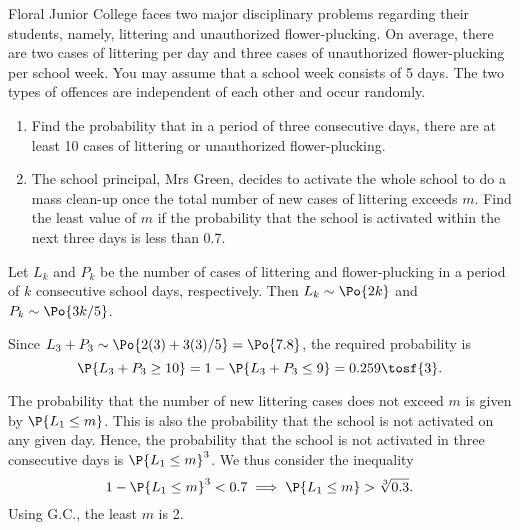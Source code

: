 \begin{problem}
    Floral Junior College faces two major disciplinary problems regarding their students, namely, littering and unauthorized flower-plucking. On average, there are two cases of littering per day and three cases of unauthorized flower-plucking per school week. You may assume that a school week consists of 5 days. The two types of offences are independent of each other and occur randomly.

    \begin{enumerate}
        \item Find the probability that in a period of three consecutive days, there are at least 10 cases of littering or unauthorized flower-plucking.
        \item The school principal, Mrs Green, decides to activate the whole school to do a mass clean-up once the total number of new cases of littering exceeds $m$. Find the least value of $m$ if the probability that the school is activated within the next three days is less than 0.7.
    \end{enumerate}
\end{problem}
\begin{solution}
    Let $L_k$ and $P_k$ be the number of cases of littering and flower-plucking in a period of $k$ consecutive school days, respectively. Then $L_k \sim \Po{2k}$ and $P_k \sim \Po{3k/5}$.

    \begin{ppart}
        Since $L_3 + P_3 \sim \Po{2(3) + 3(3)/5} = \Po{7.8}$, the required probability is \[\P{L_3 + P_3 \geq 10} = 1 - \P{L_3 + P_3 \leq 9} = 0.259 \tosf{3}.\]
    \end{ppart}
    \begin{ppart}
        The probability that the number of new littering cases does not exceed $m$ is given by $\P{L_1 \leq m}$. This is also the probability that the school is not activated on any given day. Hence, the probability that the school is not activated in three consecutive days is $\P{L_1 \leq m}^3$. We thus consider the inequality \[1 - \P{L_1 \leq m}^3 < 0.7 \implies \P{L_1 \leq m} > \sqrt[3]{0.3}.\] Using G.C., the least $m$ is 2.
    \end{ppart}
\end{solution}

